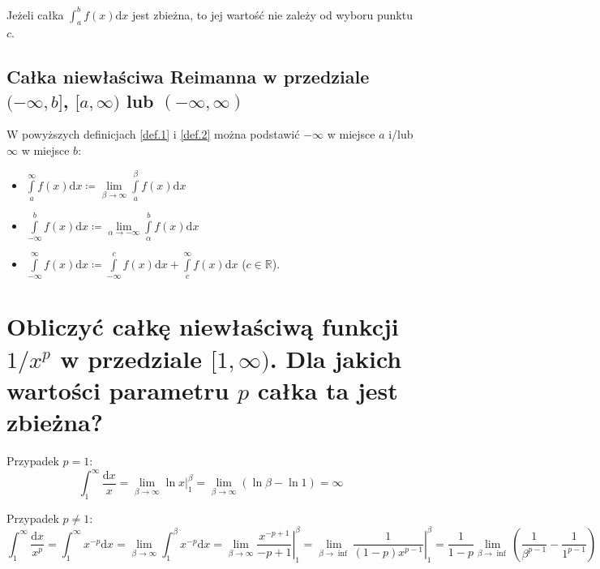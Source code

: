 \documentclass{article}
\theoremstyle{definition}
\theoremstyle{case}
\begin{document}
Jeżeli całka $\int_a^b f(x) \mathrm d x$ jest zbieżna, to jej wartość nie zależy od wyboru punktu $c$.

\subsection{Całka niewłaściwa Reimanna w przedziale
	\texorpdfstring{$(-\infty,b]$}{(-inf,b]},
	\texorpdfstring{$[a,\infty)$}{[a,+inf)} lub
	\texorpdfstring{$(-\infty,\infty)$}{(-inf,+inf)}
}
W powyższych definicjach \ref{def.1} i \ref{def.2} można podstawić $-\infty$ w miejsce $a$ i/lub $\infty$ w miejsce $b$:
\begin{itemize}
	\item
		$\int\limits_a^{\infty} f(x) \mathrm d x
		\coloneqq
		\lim\limits_{\beta \to \infty} \int\limits_a^{\beta} f(x) \mathrm d x$
	\item
		$\int\limits_{-\infty}^b f(x) \mathrm d x
		\coloneqq
		\lim\limits_{\alpha \to -\infty} \int\limits_{\alpha}^b f(x) \mathrm d x$
	\item
		$\int\limits_{-\infty}^{\infty} f(x) \mathrm d x
		\coloneqq
		\int\limits_{-\infty}^{c} f(x) \mathrm d x + \int\limits_{c}^{\infty} f(x) \mathrm d x$ ($c \in \mathbb{R}$).
\end{itemize}

\section{Obliczyć całkę niewłaściwą funkcji
	\texorpdfstring{$ 1 / x^p $}{1/x\textasciicircum p}
	w przedziale
	\texorpdfstring{$ [ 1, \infty ) $}{[1,inf)}.
	Dla jakich wartości parametru $p$ całka ta jest zbieżna?}

Przypadek $p=1$:
\begin{equation*}
	\int_1^\infty \frac{\mathrm d x}{x}
	= \lim_{\beta \to \infty} \left. \ln x \right|_1^{\beta}
	= \lim_{\beta \to \infty} (\ln \beta -\ln 1)
	= \infty
\end{equation*}

Przypadek $p\neq 1$:
\begin{equation*}
	\int_1^{\infty}\frac{\mathrm d x}{x^p}
	= \int_1^{\infty} x^{-p} \mathrm d x
	= \lim_{\beta \to \infty}\int_1^\beta x^{-p} \mathrm d x
	= \lim_{\beta \to \infty} \left. \frac{x^{-p+1}}{-p+1} \right|_1^\beta
	= \lim_{\beta \to \inf} \left. \frac{1}{(1-p)x^{p-1}} \right|_1^\beta
	= \frac{1}{1-p} \lim_{\beta \to \inf} \left( \frac{1}{\beta^{p-1}} - \frac{1}{1^{p-1}} \right)
\end{equation*}
\end{document}
